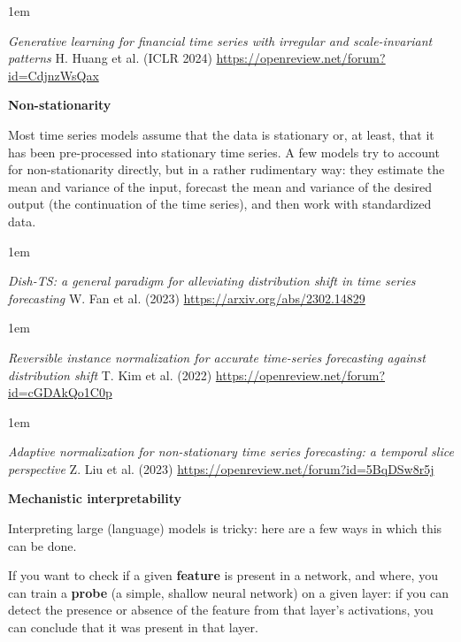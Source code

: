 \documentclass[a5paper]{article}
\let\d\textbf
\newenvironment{reference}{%
  \medskip\goodbreak
  \parskip 0pt
  \raggedright
  \leftskip 1em
  \obeylines
}{\par\medskip\goodbreak}
\def\section#1{\clearpage{\vspace*{0cm}\LARGE\centering\bfseries #1\par\bigskip\bigskip}}
\def\subsection#1{{\par\bigskip\goodbreak\large\bfseries #1\par}}
\begin{document}
\begin{reference}
  \emph{Generative learning for financial time series with irregular and scale-invariant patterns}
  H. Huang et al. (ICLR 2024)
  \url{https://openreview.net/forum?id=CdjnzWsQax}
\end{reference}

\subsection{Non-stationarity}

Most time series models assume that the data is stationary or, at least,
that it has been pre-processed into stationary time series.
A few models try to account for non-stationarity directly,
but in a rather rudimentary way: they estimate the mean and variance of the input,
forecast the mean and variance of the desired output (the continuation of the time series),
and then work with standardized data.

\begin{reference}
  \emph{Dish-TS: a general paradigm for alleviating distribution shift in time series forecasting}
  W. Fan et al. (2023)
  \url{https://arxiv.org/abs/2302.14829}
\end{reference}

\begin{reference}
  \emph{Reversible instance normalization  for accurate time-series forecasting  against distribution shift}
  T. Kim et al. (2022)
  \url{https://openreview.net/forum?id=cGDAkQo1C0p}
\end{reference}

\begin{reference}
  \emph{Adaptive normalization  for non-stationary time series forecasting:  a temporal slice perspective}
  Z. Liu et al. (2023)
  \url{https://openreview.net/forum?id=5BqDSw8r5j}
\end{reference}

\section{Interpretability}
\subsection{Mechanistic interpretability}

Interpreting large (language) models is tricky:
here are a few ways in which this can be done.

If you want to check if a given \d{feature} is present
in a network, and where, you can train a \d{probe} (a simple, shallow neural network)
on a given layer: if you can detect the presence or absence of the feature from that layer's activations,
you can conclude that it was present in that layer.
\end{document}
